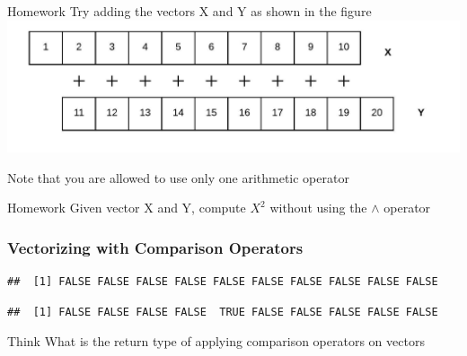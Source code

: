 \documentclass[12pt]{book}\usepackage{knitr}
\begin{document}
\begin{DIY}{Homework}
 Try adding the vectors X and Y as shown in the figure
 \includegraphics[width=7 cm]{./viz/ext/shiftAndAdd.jpeg}
 
 Note that you are allowed to use only one arithmetic operator
\end{DIY}

\begin{DIY}{Homework}
Given vector X and Y, compute $X^2$ without using the $\wedge$ operator
\end{DIY}

\subsubsection{Vectorizing with Comparison Operators}
\begin{knitrout}
\color{fgcolor}\begin{kframe}
\begin{alltt}
\hlkwb{<-}\hlstd{(}\hlstd{,}\hlstd{)} 
\hlkwb{<-}\hlstd{(}\hlstd{,}\hlstd{)} 
 \hlopt{>}     
\end{alltt}
\begin{verbatim}
##  [1] FALSE FALSE FALSE FALSE FALSE FALSE FALSE FALSE FALSE FALSE
\end{verbatim}
\begin{alltt}
\hlstd{Y[}\hlstd{]}\hlkwb{<-}\hlstd{X[}\hlstd{]} 
 \hlopt{==}  
\end{alltt}
\begin{verbatim}
##  [1] FALSE FALSE FALSE FALSE  TRUE FALSE FALSE FALSE FALSE FALSE
\end{verbatim}
\end{kframe}
\end{knitrout}

\begin{DIY}{Think}
What is the return type of applying comparison operators on vectors
\end{DIY}
\end{document}
